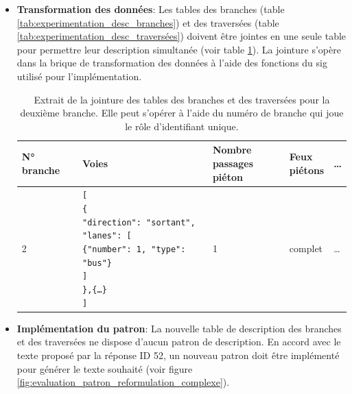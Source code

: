 \begin{itemize}
    \item \textbf{Transformation des données}: Les tables des branches (table \ref{tab:experimentation_desc_branches}) et des traversées (table \ref{tab:experimentation_desc_traversées}) doivent être jointes en une seule table pour permettre leur description simultanée (voir table \ref{tab:evaluation_desc_branches}). La jointure s'opère dans la brique de transformation des données à l'aide des fonctions du \gls{sig} utilisé pour l'implémentation.
    \begin{table}[ht]
        \begin{center}
            \footnotesize
            \begin{tabular}{ | l | l | l | l | l |}
                \textbf{N° branche} & \textbf{Voies}& \makecell{\textbf{Nombre}\\\textbf{passages piéton}} & \makecell{\textbf{Feux}\\\textbf{piétons}} & …\\
                \hline
                2 & 
                \makecell{
                    \texttt[\\
                    \hspace{0.5cm}\texttt{\{}\\
                    \hspace{1cm}\texttt{"direction": "sortant",}\\
                    \hspace{1cm}\texttt{"lanes": [}\\
                    \hspace{1.5cm}\texttt{\{"number": 1, "type": "bus"\}}\\
                    \hspace{1cm}\texttt{]}\\
                    \hspace{0.5cm}\texttt{\},\{…\}}\\
                    \texttt]
                } & 1 & complet & …
            \end{tabular}
        \end{center}
        \caption[Jointure des tables branches et traversées]{Extrait de la jointure des tables des branches et des traversées pour la deuxième branche. Elle peut s'opérer à l'aide du numéro de branche qui joue le rôle d'identifiant unique.}
        \label{tab:evaluation_desc_branches}
    \end{table}
    \item \textbf{Implémentation du patron}: La nouvelle table de description des branches et des traversées ne dispose d'aucun patron de description. En accord avec le texte proposé par la réponse ID 52, un nouveau patron doit être implémenté pour générer le texte souhaité (voir figure \ref{fig:evaluation_patron_reformulation_complexe}).

\end{itemize}
